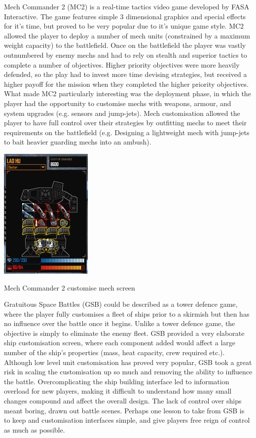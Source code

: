 Mech Commander 2 (MC2) is a real-time tactics video game developed by FASA Interactive. The game features simple 3 dimensional graphics and special effects for it's time, but proved to be very popular due to it's unique game style. MC2 allowed the player to deploy a number of mech units (constrained by a maximum weight capacity) to the battlefield. Once on the battlefield the player was vastly outnumbered by enemy mechs and had to rely on stealth and superior tactics to complete a number of objectives. Higher priority objectives were more heavily defended, so the play had to invest more time devising strategies, but received a higher payoff for the mission when they completed the higher priority objectives. What made MC2 particularly interesting was the deployment phase, in which the player had the opportunity to customise mechs with weapons, armour, and system upgrades (e.g. sensors and jump-jets). Mech customisation allowed the player to have full control over their strategies by outfitting mechs to meet their requirements on the battlefield (e.g. Designing a lightweight mech with jump-jets to bait heavier guarding mechs into an ambush).

\begin{marginfigure}
	\includegraphics{res/mc2/laohu_lab_half}
	\caption{Mech Commander 2 customise mech screen}
\end{marginfigure}

Gratuitous Space Battles (GSB) could be described as a tower defence game, where the player fully customises a fleet of ships prior to a skirmish but then has no influence over the battle once it begins. Unlike a tower defence game, the objective is simply to eliminate the enemy fleet. GSB provided a very elaborate ship customisation screen, where each component added would affect a large number of the ship's properties (mass, heat capacity, crew required etc.). Although low level unit customisation has proved very popular, GSB took a great risk in scaling the customisation up so much and removing the ability to influence the battle. Overcomplicating the ship building interface led to information overload for new players, making it difficult to understand how many small changes compound and affect the overall design. The lack of control over ships meant boring, drawn out battle scenes. Perhaps one lesson to take from GSB is to keep and customisation interfaces simple, and give players free reign of control as much as possible.


